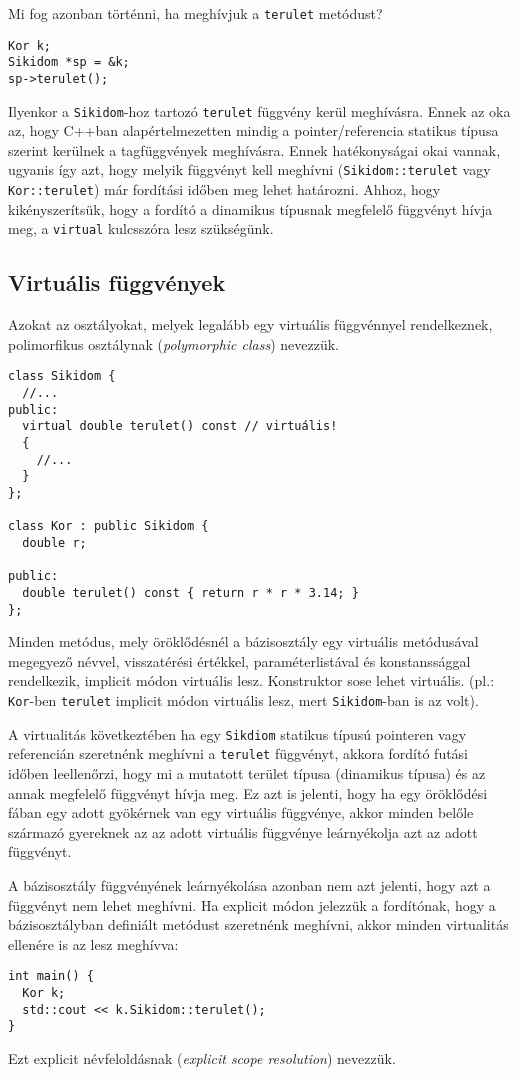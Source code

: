 \documentclass[../cpp_book/cpp_book.tex]{subfiles}
\begin{document}
	Mi fog azonban történni, ha meghívjuk a \texttt{terulet} metódust?
	\begin{lstlisting}
Kor k;
Sikidom *sp = &k;
sp->terulet();
	\end{lstlisting}
	Ilyenkor a \texttt{Sikidom}-hoz tartozó \texttt{terulet} függvény kerül meghívásra. Ennek az oka az, hogy C++ban alapértelmezetten mindig a pointer/referencia statikus típusa szerint kerülnek a tagfüggvények meghívásra. Ennek hatékonyságai okai vannak, ugyanis így azt, hogy melyik függvényt kell meghívni (\texttt{Sikidom::terulet} vagy \texttt{Kor::terulet}) már fordítási időben meg lehet határozni. Ahhoz, hogy kikényszerítsük, hogy a fordító a dinamikus típusnak megfelelő függvényt hívja meg, a \texttt{virtual} kulcsszóra lesz szükségünk.
	\subsection{Virtuális függvények}
	Azokat az osztályokat, melyek legalább egy virtuális függvénnyel rendelkeznek, polimorfikus osztálynak (\textit{polymorphic class}) nevezzük.
\begin{lstlisting}
class Sikidom {
  //...
public:
  virtual double terulet() const // virtuális!
  {
    //...
  }
};

class Kor : public Sikidom {
  double r;

public:
  double terulet() const { return r * r * 3.14; }
};
\end{lstlisting}
	Minden metódus, mely öröklődésnél a bázisosztály egy virtuális metódusával megegyező névvel, visszatérési értékkel, paraméterlistával és konstanssággal rendelkezik, implicit módon virtuális lesz. Konstruktor sose lehet virtuális. (pl.: \texttt{Kor}-ben \texttt{terulet} implicit módon virtuális lesz, mert \texttt{Sikidom}-ban is az volt).
	
	\smallskip
	A virtualitás következtében ha egy \texttt{Sikdiom} statikus típusú pointeren vagy referencián szeretnénk meghívni a \texttt{terulet} függvényt, akkora  fordító futási időben leellenőrzi, hogy mi a mutatott terület típusa (dinamikus típusa) és az annak megfelelő függvényt hívja meg. Ez azt is jelenti, hogy ha egy öröklődési fában egy adott gyökérnek van egy virtuális függvénye, akkor minden belőle származó gyereknek az az adott virtuális függvénye leárnyékolja azt az adott függvényt.

	A bázisosztály függvényének leárnyékolása azonban nem azt jelenti, hogy azt a függvényt nem lehet meghívni. Ha explicit módon jelezzük a fordítónak, hogy a bázisosztályban definiált metódust szeretnénk meghívni, akkor minden virtualitás ellenére is az lesz meghívva:
	\begin{lstlisting}
int main() {
  Kor k;
  std::cout << k.Sikidom::terulet();
}
	\end{lstlisting}
	Ezt explicit névfeloldásnak (\textit{explicit scope resolution}) nevezzük.
	
\end{document}
